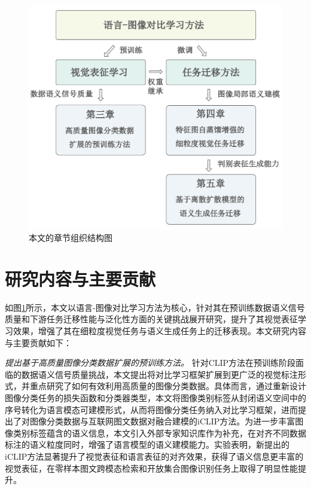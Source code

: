 \begin{figure}
  \centering
  \includegraphics[width=0.9\linewidth]{figures/论文-结构安排-v3.pdf}
  \caption{本文的章节组织结构图}
  \label{fig:7-thesis-structure}
\end{figure}

\section{研究内容与主要贡献}

如图\ref{fig:7-thesis-structure}所示，本文以语言-图像对比学习方法为核心，针对其在预训练数据语义信号质量和下游任务迁移性能与泛化性方面的关键挑战展开研究，提升了其视觉表征学习效果，增强了其在细粒度视觉任务与语义生成任务上的迁移表现。本文研究内容与主要贡献如下：

\textit{提出基于高质量图像分类数据扩展的预训练方法。}
针对CLIP方法在预训练阶段面临的数据语义信号质量挑战，本文提出将对比学习框架扩展到更广泛的视觉标注形式，并重点研究了如何有效利用高质量的图像分类数据。具体而言，通过重新设计图像分类任务的损失函数和分类器类型，本文将图像类别标签从封闭语义空间中的序号转化为语言模态可建模形式，从而将图像分类任务纳入对比学习框架，进而提出了对图像分类数据与互联网图文数据对融合建模的iCLIP方法。为进一步丰富图像类别标签蕴含的语义信息，本文引入外部专家知识库作为补充，在对齐不同数据标注的语义粒度同时，增强了语言模型的语义建模能力。实验表明，新提出的iCLIP方法显著提升了视觉表征和语言表征的对齐效果，获得了语义信息更丰富的视觉表征，在零样本图文跨模态检索和开放集合图像识别任务上取得了明显性能提升。


